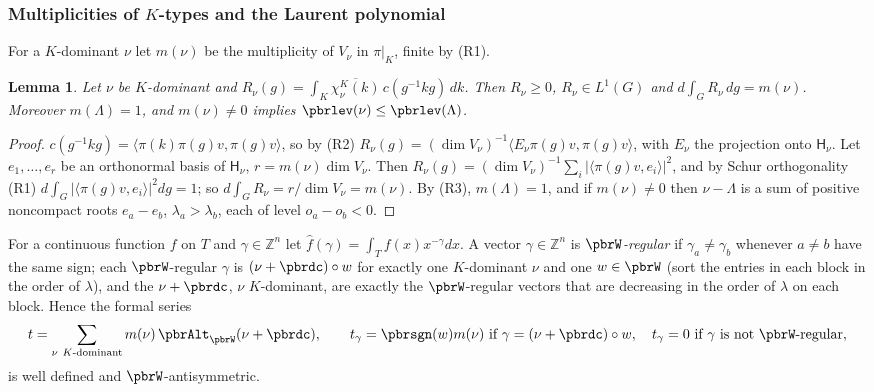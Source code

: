 \documentclass[10pt]{amsart}
\newtheorem{lemma}[theorem]{Lemma}
\theoremstyle{definition}
\theoremstyle{remark}
\newcommand{\Z}{\mathbb Z}
\providecommand{\aubar}[1]{\overline{#1}}
\begin{document}
\subsubsection{Multiplicities of $K$-types and the Laurent polynomial}\label{pbr:ss-mult}

For a $K$-dominant $\nu$ let $m(\nu)$ be the multiplicity of $V_\nu$ in $\pi|_K$, finite by (R1).

\begin{lemma}\label{pbr:mult}
Let $\nu$ be $K$-dominant and $R_\nu(g)=\int_K\aubar{\chi^K_\nu(k)}\,c(g^{-1}kg)\,dk$. Then
$R_\nu\ge0$, $R_\nu\in L^1(G)$ and $d\int_GR_\nu\,dg=m(\nu)$. Moreover $m(\Lambda)=1$, and
$m(\nu)\ne0$ implies $\pbrlev(\nu)\le\pbrlev(\Lambda)$.
\end{lemma}
\begin{proof}
$c(g^{-1}kg)=\langle\pi(k)\pi(g)v,\pi(g)v\rangle$, so by (R2) $R_\nu(g)=(\dim V_\nu)^{-1}\langle
E_\nu\pi(g)v,\pi(g)v\rangle$, with $E_\nu$ the projection onto $\mathsf H_\nu$. Let $e_1,\dots,e_r$ be
an orthonormal basis of $\mathsf H_\nu$, $r=m(\nu)\dim V_\nu$. Then $R_\nu(g)=(\dim V_\nu)^{-1}
\sum_i|\langle\pi(g)v,e_i\rangle|^2$, and by Schur orthogonality (R1) $d\int_G|\langle\pi(g)v,e_i
\rangle|^2dg=1$; so $d\int_GR_\nu=r/\dim V_\nu=m(\nu)$. By (R3), $m(\Lambda)=1$, and if $m(\nu)\ne0$ then
$\nu-\Lambda$ is a sum of positive noncompact roots $e_a-e_b$, $\lambda_a>\lambda_b$, each of level
$o_a-o_b<0$.
\end{proof}

For a continuous function $f$ on $T$ and $\gamma\in\Z^n$ let $\hat f(\gamma)=\int_Tf(x)x^{-\gamma}dx$.
A vector $\gamma\in\Z^n$ is \emph{$\pbrW$-regular} if $\gamma_a\ne\gamma_b$ whenever $a\ne b$ have
the same sign; each $\pbrW$-regular $\gamma$ is $(\nu+\pbrdc)\circ w$ for exactly one $K$-dominant
$\nu$ and one $w\in\pbrW$ (sort the entries in each block in the order of $\lambda$), and the
$\nu+\pbrdc$, $\nu$ $K$-dominant, are exactly the $\pbrW$-regular vectors that are decreasing in the
order of $\lambda$ on each block. Hence the formal series
\[
t=\sum_{\nu\ K\text{-dominant}}m(\nu)\,\pbrAlt_{\pbrW}(\nu+\pbrdc),\qquad t_\gamma=\pbrsgn(w)m(\nu)
\text{ if }\gamma=(\nu+\pbrdc)\circ w,\quad t_\gamma=0\text{ if $\gamma$ is not $\pbrW$-regular},
\]
is well defined and $\pbrW$-antisymmetric.
\end{document}
